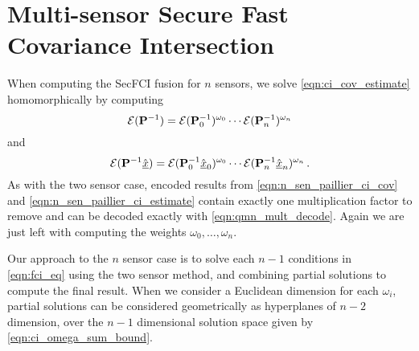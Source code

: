\documentclass[letterpaper, 10 pt, conference]{ieeeconf}  %
\begin{document}
\section{Multi-sensor Secure Fast Covariance Intersection} \label{sec:multi_secfci}
When computing the SecFCI fusion for $n$ sensors, we solve \eqref{eqn:ci_cov_estimate} homomorphically by computing
\begin{equation}
   \mathcal{E}({{\mathbf{P}}}^{-1}) = \mathcal{E}({{\mathbf{P}}}^{-1}_0)^{\omega_0}\cdots\mathcal{E}({{\mathbf{P}}}^{-1}_n)^{\omega_n} \label{eqn:n_sen_paillier_ci_cov}
\end{equation}
and
\begin{equation}
   \mathcal{E}({{\mathbf{P}}}^{-1}\hat{{\underline{x}}}) = \mathcal{E}({{\mathbf{P}}}^{-1}_0\hat{{\underline{x}}}_0)^{\omega_0}\cdots\mathcal{E}({{\mathbf{P}}}^{-1}_n\hat{{\underline{x}}}_n)^{\omega_n}\,. \label{eqn:n_sen_paillier_ci_estimate}
\end{equation}
As with the two sensor case, encoded results from \eqref{eqn:n_sen_paillier_ci_cov} and \eqref{eqn:n_sen_paillier_ci_estimate} contain exactly one multiplication factor to remove and can be decoded exactly with \eqref{eqn:qmn_mult_decode}. Again we are just left with computing the weights $\omega_0,\dots,\omega_n$.

Our approach to the $n$ sensor case is to solve each $n-1$ conditions in \eqref{eqn:fci_eq} using the two sensor method, and combining partial solutions to compute the final result. When we consider a Euclidean dimension for each $\omega_i$, partial solutions can be considered geometrically as hyperplanes of $n-2$ dimension, over the $n-1$ dimensional solution space given by \eqref{eqn:ci_omega_sum_bound}. 
\end{document}
